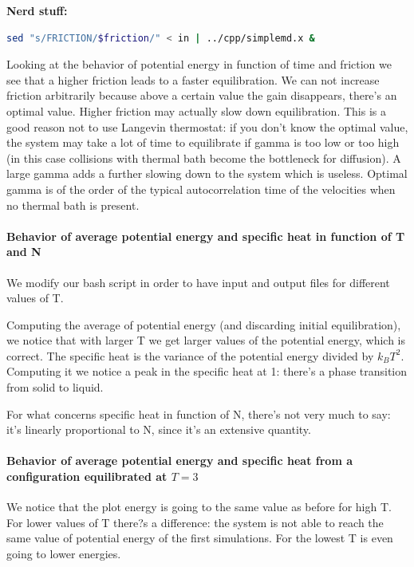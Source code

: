 \documentclass[a4paper, italian, openany]{book}
\begin{document}
\textbf{Nerd stuff:} 
\begin{lstlisting}[language=bash]
sed "s/FRICTION/$friction/" < in | ../cpp/simplemd.x &
\end{lstlisting}

Looking at the behavior of potential energy in function of time and friction we see that a higher friction leads to a faster equilibration. We can not increase friction arbitrarily because above a certain value the gain disappears, there's an optimal value. Higher friction may actually slow down equilibration. This is a good reason not to use Langevin thermostat: if you don't know the optimal value, the system may take a lot of time to equilibrate if gamma is too low or too high (in this case collisions with thermal bath become the bottleneck for diffusion).\newline
A large gamma adds a further slowing down to the system which is useless. Optimal gamma is of the order of the typical autocorrelation time of the velocities when no thermal bath is present.

\paragraph{Behavior of average potential energy and specific heat in function of T and N}

We modify our bash script in order to have input and output files for different values of T.

\medskip

Computing the average of potential energy (and discarding initial equilibration), we notice that with larger T we get larger values of the potential energy, which is correct.\newline
The specific heat is the variance of the potential energy divided by $k_B T^2$. Computing it we notice a peak in the specific heat at 1: there's a phase transition from solid to liquid.

\medskip

For what concerns specific heat in function of N, there's not very much to say: it's linearly proportional to N, since it's an extensive quantity.

\paragraph{Behavior of average potential energy and specific heat from a configuration equilibrated at $T=3$}

We notice that the plot energy is going to the same value as before for high T. For lower values of T there?s a difference: the system is not able to reach the same value of potential energy of the first simulations. For the lowest T is even going to lower energies.
\end{document}
